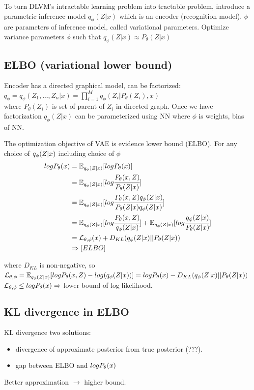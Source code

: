 \documentclass[12pt,a4paper]{article}
\begin{document}
To turn DLVM's intractable learning problem into tractable problem, introduce a parametric inference model $q_\phi(Z|x)$ which is an encoder (recognition model). $\phi$ are parameters of inference model, called variational parameters. Optimize variance parameters $\phi$ such that $q_\phi(Z|x)\approx P_\theta(Z|x)$


\subsection{ELBO (variational lower bound)}
Encoder has a directed graphical model, can be factorized:\\
$q_\phi=q_\phi(Z_1, ..., Z_n|x)=\prod^M_{i=1} q_\phi(Z_i|P_\theta(Z_i),x)$ \\
where $P_\theta(Z_i)$ is set of parent of $Z_i$ in directed graph. 
Once we have factorization $q_\phi(Z|x)$ can be parameterized using NN where $\phi$ is weights, bias of NN. 

The optimization objective of VAE is evidence lower bound (ELBO). For any choice of $q_\phi(Z|x)$ including choice of $\phi$\\

\begin{equation}
    \begin{split}
    log P_\theta (x) &= \mathbb{E}_{q_\phi(Z|x)}[logP_\theta(x)] \\
    &=\mathbb{E}_{q_\phi(Z|x)}[log\cfrac{P_\theta(x,Z)}{P_\theta(Z|x)}]\\
    &=\mathbb{E}_{q_\phi(Z|x)}[log \cfrac{P_\theta(x,Z)q_\phi(Z|x)}{P_\theta(Z|x)q_\phi(Z|x)}] \\
    &=\mathbb{E}_{q_\phi(Z|x)}[log\cfrac{P_\theta(x,Z)}{q_\phi(Z|x)}]+\mathbb{E}_{q_\phi(Z|x)}[log\cfrac{q_\phi(Z|x)}{P_\theta(Z|x)}]\\
    &=\mathcal{L}_{\theta,\phi}(x)+D_{KL}(q_\phi(Z|x)||P_\theta(Z|x))\\
    &\Rightarrow [ELBO]\\
\end{split}
\end{equation}

where $D_{KL}$ is non-negative, so\\ 
$\mathcal{L}_{\theta,\phi}=\mathbb{E}_{q_\phi(Z|x)}[log P_\theta(x,Z)-log(q_\phi(Z|x))]
=logP_\theta(x)-D_{KL}(q_\phi(Z|x)||P_\theta(Z|x))$\\
$\mathcal{L}_{\theta,\phi}\le log P_\theta(x)\Rightarrow$ lower bound of log-likelihood.

\subsection{KL divergence in ELBO}
KL divergence two solutions:
\begin{itemize}
\item divergence of approximate posterior from true posterior (???).
\item gap between ELBO and $logP_\theta(x)$
\end{itemize}
Better approximation $\rightarrow$ higher bound.
\end{document}
